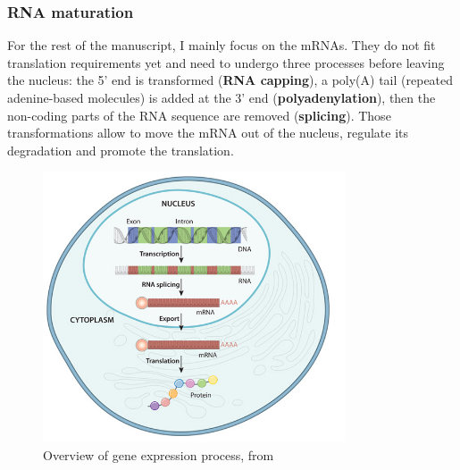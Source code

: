 \subsubsection{RNA maturation}

For the rest of the manuscript, I mainly focus on the \ac{mRNA}s.
They do not fit translation requirements yet and need to undergo three processes before leaving the nucleus: the 5' end is transformed (\textbf{\ac{RNA} capping}), a poly(A) tail (repeated adenine-based molecules) is added at the 3' end (\textbf{polyadenylation}), then the non-coding parts of the \ac{RNA} sequence are removed (\textbf{splicing}).
Those transformations allow to move the \ac{mRNA} out of the nucleus, regulate its degradation and promote the translation.

\begin{figure}[h]
    \centering
    \includegraphics[width=0.8\textwidth]{figures/introduction/gene_expression_process.jpg}
    \caption[Gene expression process]{Overview of gene expression process, from~\cite{cell_essential_nature}}
    \label{fig:gene_expression}
\end{figure}


